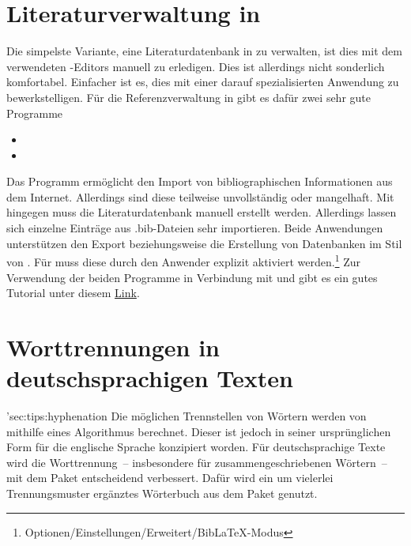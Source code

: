\section{Literaturverwaltung in }
%
Die simpelste Variante, eine Literaturdatenbank in  zu verwalten, 
ist dies mit dem verwendeten -Editors manuell zu erledigen. Dies 
ist allerdings nicht sonderlich komfortabel. Einfacher ist es, dies mit einer 
darauf spezialisierten Anwendung zu bewerkstelligen. Für die Referenzverwaltung 
in  gibt es dafür zwei sehr gute Programme
%
\begin{itemize}
\item {}
\item {}
\end{itemize}
%
Das Programm  ermöglicht den Import von bibliographischen 
Informationen aus dem Internet. Allerdings sind diese teilweise unvollständig 
oder mangelhaft. Mit  hingegen muss die Literaturdatenbank 
manuell erstellt werden. Allerdings lassen sich einzelne Einträge aus 
.bib-Dateien sehr importieren. Beide Anwendungen unterstützen den Export 
beziehungsweise die Erstellung von Datenbanken im Stil von . 
Für  muss diese durch den Anwender explizit aktiviert 
werden.\footnote{Optionen/Einstellungen/Erweitert/BibLaTeX-Modus} 
Zur Verwendung der beiden Programme in Verbindung mit  und 
 gibt es ein gutes Tutorial unter diesem
\href{http://www.suedraum.de/latex/stammtisch/degenkolb_latex_biblatex_folien-final.pdf}{Link}.



\section{Worttrennungen in deutschsprachigen Texten}
\manualhyperdef'{sec:tips:hyphenation}
%
%
Die möglichen Trennstellen von Wörtern werden von  mithilfe 
eines Algorithmus berechnet. Dieser ist jedoch in seiner ursprünglichen Form 
für die englische Sprache konzipiert worden. Für deutschsprachige Texte wird 
die Worttrennung~-- insbesondere für zusammengeschriebenen Wörtern~-- mit dem 
Paket  entscheidend verbessert. Dafür wird ein um vielerlei 
Trennungsmuster ergänztes Wörterbuch aus dem Paket  
genutzt. 

